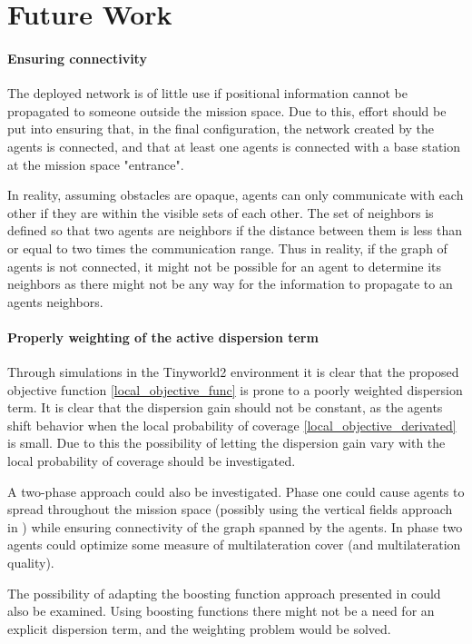 \section{Future Work}
\paragraph{Ensuring connectivity}
The deployed network is of little use if positional information cannot be propagated to someone outside the mission space.
Due to this, effort should be put into ensuring that, in the final configuration, the network created by the agents 
is connected, and that at least one agents is connected with a base station at the mission space "entrance".

In reality, assuming obstacles are opaque, agents can only communicate with each other if they are within the visible sets of each other. 
The set of neighbors is defined so that two agents are neighbors if the distance between them is less than or equal to two times the communication range.
Thus in reality, if the graph of agents is not connected, it might not be possible for an agent to determine its neighbors as there might not be any way for 
the information to propagate to an agents neighbors.

\paragraph{Properly weighting of the active dispersion term}
Through simulations in the Tinyworld2 environment it is clear that the proposed objective function \eqref{local_objective_func} is 
prone to a poorly weighted dispersion term. It is clear that the dispersion gain should not be constant, 
as the agents shift behavior when the local probability of coverage \eqref{local_objective_derivated} is small. Due to this
the possibility of letting the dispersion gain vary with the local probability of coverage should be investigated. 

A two-phase 
approach could also be investigated. Phase one could cause agents to spread throughout the mission space (possibly using the vertical fields
approach in \cite{pot_field}) while ensuring connectivity of the graph spanned by the agents. In phase two agents could optimize some
measure of multilateration cover (and multilateration quality).

The possibility of adapting the boosting function approach presented in \cite{sun2014escaping} could also be examined. Using boosting
functions there might not be a need for an explicit dispersion term, and the weighting problem would be solved.

